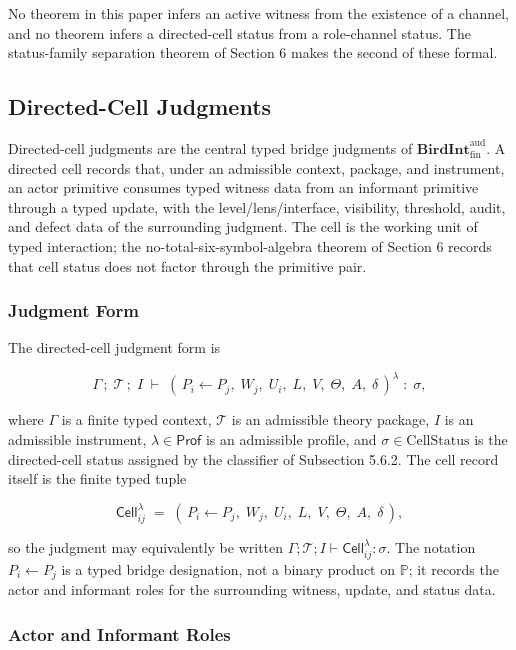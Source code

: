 \documentclass[11pt]{article}
\theoremstyle{definition}
\begin{document}
No theorem in this paper infers an active witness from the existence of a channel, and no theorem infers a directed-cell status from a role-channel status. The status-family separation theorem of Section 6 makes the second of these formal.

\subsection{Directed-Cell Judgments}

Directed-cell judgments are the central typed bridge judgments of \(\mathbf{BirdInt}^{\mathrm{aud}}_{\mathrm{fin}}\). A directed cell records that, under an admissible context, package, and instrument, an actor primitive consumes typed witness data from an informant primitive through a typed update, with the level/lens/interface, visibility, threshold, audit, and defect data of the surrounding judgment. The cell is the working unit of typed interaction; the no-total-six-symbol-algebra theorem of Section 6 records that cell status does not factor through the primitive pair.

\subsubsection{Judgment Form}

The directed-cell judgment form is

\[
\Gamma\,;\;\mathcal T\,;\;I\;\vdash\;(\,P_i\leftarrow P_j,\;W_j,\;U_i,\;L,\;V,\;\Theta,\;A,\;\delta\,)^{\lambda}\;:\;\sigma,
\]

where \(\Gamma\) is a finite typed context, \(\mathcal T\) is an admissible theory package, \(I\) is an admissible instrument, \(\lambda\in\mathsf{Prof}\) is an admissible profile, and \(\sigma\in\mathrm{CellStatus}\) is the directed-cell status assigned by the classifier of Subsection 5.6.2. The cell record itself is the finite typed tuple

\[
\mathsf{Cell}_{ij}^{\lambda}\;=\;(\,P_i\leftarrow P_j,\;W_j,\;U_i,\;L,\;V,\;\Theta,\;A,\;\delta\,),
\]

so the judgment may equivalently be written \(\Gamma;\mathcal T;I\vdash\mathsf{Cell}_{ij}^{\lambda}:\sigma\). The notation \(P_i\leftarrow P_j\) is a typed bridge designation, not a binary product on \(\mathbb P\); it records the actor and informant roles for the surrounding witness, update, and status data.

\subsubsection{Actor and Informant Roles}
\end{document}
